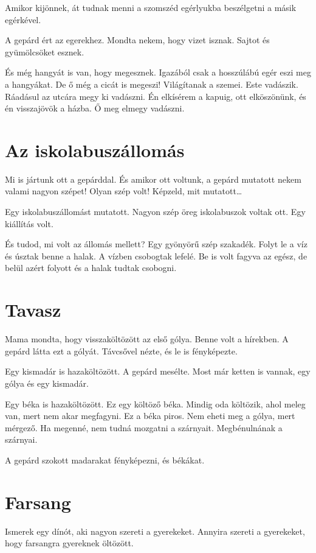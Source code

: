 \documentclass[12pt]{memoir}
\newcommand{\image}[1]{%
\incgraph[documentpaper][keepaspectratio=true,width=\paperwidth,height=\paperheight]{gepard/#1}}
\begin{document}
Amikor kijönnek, át tudnak menni a szomszéd egérlyukba beszélgetni a másik
egérkével.

A gepárd ért az egerekhez. Mondta nekem, hogy vizet isznak. Sajtot és
gyümölcsöket esznek.

És még hangyát is van, hogy megesznek. Igazából csak a hosszúlábú egér eszi meg
a hangyákat. De ő még a cicát is megeszi! Világítanak a szemei. Este vadászik.
Ráadásul az utcára megy ki vadászni. Én elkísérem a kapuig, ott elköszönünk, és
én visszajövök a házba. Ő meg elmegy vadászni.
\cleartoverso


\section{Az iskolabuszállomás}
Mi is jártunk ott a gepárddal. És amikor ott voltunk, a gepárd mutatott nekem
valami nagyon szépet! Olyan szép volt! Képzeld, mit mutatott…

Egy iskolabuszállomást mutatott. Nagyon szép öreg iskolabuszok voltak ott. Egy
kiállítás volt.

És tudod, mi volt az állomás mellett? Egy gyönyörű szép szakadék. Folyt le a
víz és úsztak benne a halak. A vízben csobogtak lefelé. Be is volt fagyva az
egész, de belül azért folyott és a halak tudtak csobogni.
\image{iskolabuszallomas.png}


\section{Tavasz}
Mama mondta, hogy visszaköltözött az első gólya. Benne volt a hírekben. A
gepárd látta ezt a gólyát. Távcsővel nézte, és le is fényképezte.

Egy kismadár is hazaköltözött. A gepárd mesélte. Most már ketten is vannak, egy
gólya és egy kismadár.

Egy béka is hazaköltözött. Ez egy költöző béka. Mindig oda költözik, ahol meleg
van, mert nem akar megfagyni. Ez a béka piros. Nem eheti meg a gólya, mert
mérgező. Ha megenné, nem tudná mozgatni a szárnyait. Megbénulnának a szárnyai.

A gepárd szokott madarakat fényképezni, és békákat.
\cleartoverso


\section{Farsang}
Ismerek egy dínót, aki nagyon szereti a gyerekeket. Annyira szereti a
gyerekeket, hogy farsangra gyereknek öltözött.
\end{document}
